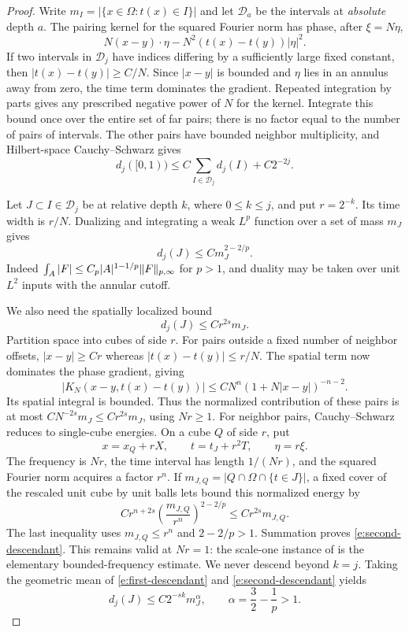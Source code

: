 \begin{proof}
Write $m_I=|\{x\in\Omega:t(x)\in I\}|$ and let $\mathcal D_a$ be the
intervals at \emph{absolute} depth $a$.  The pairing kernel for the
squared Fourier norm has phase, after $\xi=N\eta$,
\[
 N(x-y)\cdot\eta-N^2(t(x)-t(y))|\eta|^2.
\]
If two intervals in $\mathcal D_j$ have indices differing by a
sufficiently large fixed constant, then
$|t(x)-t(y)|\ge C/N$.  Since $|x-y|$ is bounded and $\eta$ lies in an
annulus away from zero, the time term dominates the gradient.
Repeated integration by parts gives any prescribed negative power of
$N$ for the kernel.  Integrate this bound once over the entire set of
far pairs; there is no factor equal to the number of pairs of
intervals.  The other pairs have bounded neighbor multiplicity, and
Hilbert-space Cauchy--Schwarz gives
\begin{equation}
 d_j([0,1))\le C\sum_{I\in\mathcal D_j}d_j(I)+C2^{-2j}.
 \label{e:initial-time-separation}
\end{equation}

Let $J\subset I\in\mathcal D_j$ be at relative depth $k$, where
$0\le k\le j$, and put $r=2^{-k}$.  Its time width is $r/N$.  Dualizing
 and integrating a weak $L^p$ function over a set of
mass $m_J$ gives
\begin{equation}
 d_j(J)\le C m_J^{2-2/p}.
 \label{e:first-descendant}
\end{equation}
Indeed $\int_A|F|\le C_p|A|^{1-1/p}\lVert F\rVert_{p,\infty}$ for $p>1$,
and duality may be taken over unit $L^2$ inputs with the annular cutoff.

We also need the spatially localized bound
\begin{equation}
 d_j(J)\le C r^{2s}m_J.
 \label{e:second-descendant}
\end{equation}
Partition space into cubes of side $r$.  For pairs outside a fixed
number of neighbor offsets, $|x-y|\ge Cr$ whereas
$|t(x)-t(y)|\le r/N$.  The spatial term now dominates the phase
gradient, giving
\[
 |K_N(x-y,t(x)-t(y))|
       \le C N^n(1+N|x-y|)^{-n-2}.
\]
Its spatial integral is bounded.  Thus the normalized contribution of
these pairs is at most $C N^{-2s}m_J\le C r^{2s}m_J$, using $Nr\ge1$.
For neighbor pairs, Cauchy--Schwarz reduces to single-cube energies.
On a cube $Q$ of side $r$, put
\[
 x=x_Q+rX,\qquad t=t_J+r^2T,\qquad \eta=r\xi.
\]
The frequency is $Nr$, the time interval has length $1/(Nr)$, and the
squared Fourier norm acquires a factor $r^n$.  If
$m_{J,Q}=|Q\cap\Omega\cap\{t\in J\}|$, a fixed cover of the rescaled
unit cube by unit balls lets  bound this normalized
energy by
\[
 C r^{n+2s}\left(\frac{m_{J,Q}}{r^n}\right)^{2-2/p}
       \le C r^{2s}m_{J,Q}.
\]
The last inequality uses $m_{J,Q}\le r^n$ and $2-2/p>1$.
Summation proves \eqref{e:second-descendant}.  This remains valid at
$Nr=1$: the scale-one instance of  is the elementary
bounded-frequency estimate.  We never descend beyond $k=j$.
Taking the geometric mean of \eqref{e:first-descendant} and
\eqref{e:second-descendant} yields
\begin{equation}
 d_j(J)\le C2^{-sk}m_J^\alpha,
 \qquad \alpha=\frac32-\frac1p>1.
 \label{e:interpolated-descendant}
\end{equation}


\end{proof}
